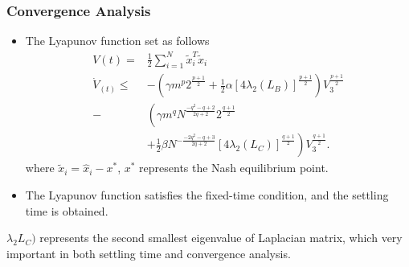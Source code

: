 
\begin{frame}
\frametitle{\normalsize{Convergence Analysis}}\transwipe

\begin{itemize}\small

\item The Lyapunov function set as follows
\begin{equation}
  \begin{aligned}
    V(t)= &\frac{1}{2} \sum_{i=1}^{N} \tilde{x}_{i}^{T} \tilde{x}_{i}\\
    \dot{V}_(t) \leq & -\left(\gamma m^{p} 2^{\frac{p+1}{2}}+\frac{1}{2} \alpha\left[4 \lambda_{2}\left(L_{B}\right)\right]^{\frac{p+1}{2}}\right) V_{3}^{\frac{p+1}{2}} \\
- & \left(\gamma m^{q} N^{\frac{-q^{2}-q+2}{2 q+2}} 2^{\frac{q+1}{2}}\right. \\
& \left.+\frac{1}{2} \beta N^{-\frac{-2 q^{2}-q+3}{2 q+2}}\left[4 \lambda_{2}\left(L_{C}\right)\right]^{\frac{q+1}{2}}\right) V_{3}^{\frac{q+1}{2}} .
  \end{aligned}
  \end{equation}
where $\tilde{x}_{i}=\hat{x}_{i}-x^{*}$, $x^{*}$  represents the Nash equilibrium point.

\item The Lyapunov function satisfies the fixed-time condition, and the settling time is obtained.
\end{itemize}
\bremark
$\lambda_{2} L_{C})$ represents the second
smallest eigenvalue of Laplacian matrix, which very important in both settling time and convergence analysis.
\eremark
\end{frame}


